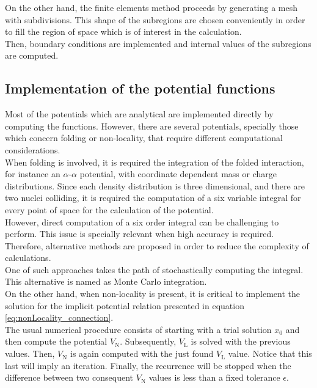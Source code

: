 \documentclass[openany]{book}
\begin{document}
On the other hand, the finite elements method proceeds by generating a mesh with subdivisions. This shape of the subregions are chosen conveniently in order to fill the region of space which is of interest in the calculation. \\

Then, boundary conditions are implemented and internal values of the subregions are computed. \\


\subsection{Implementation of the potential functions} \label{sub:diffSolvingPotential}

Most of the potentials which are analytical are implemented directly by computing the functions. However, there are several potentials, specially those which concern folding or non-locality, that require different computational considerations. \\

When folding is involved, it is required the integration of the folded interaction, for instance an $\alpha$-$\alpha$ potential, with coordinate dependent mass or charge distributions. Since each density distribution is three dimensional, and there are two nuclei colliding, it is required the computation of a six variable integral for every point of space for the calculation of the potential. \\

However, direct computation of a six order integral can be challenging to perform. This issue is specially relevant when high accuracy is required. Therefore, alternative methods are proposed in order to reduce the complexity of calculations. \\

One of such approaches takes the path of stochastically computing the integral. This alternative is named as Monte Carlo integration. \\

On the other hand, when non-locality is present, it is critical to implement the solution for the implicit potential relation presented in equation \ref{eq:nonLocality_connection}. \\

The usual numerical procedure consists of starting with a trial solution $x_0$ and then compute the potential $V_\mathrm{N}$. Subsequently, $V_\mathrm{L}$ is solved with the previous values. Then, $V_\mathrm{N}$ is again computed with the just found $V_\mathrm{L}$ value. Notice that this last will imply an iteration. Finally, the recurrence will be stopped when the difference between two consequent $V_\mathrm{N}$ values is less than a fixed tolerance $\epsilon$.
\end{document}
